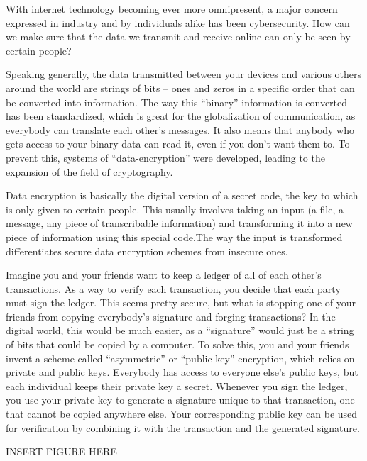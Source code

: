 With internet technology becoming ever more omnipresent, a major concern expressed in industry and by individuals alike has been cybersecurity. How can we make sure that the data we transmit and receive online can only be seen by certain people?

Speaking generally, the data transmitted between your devices and various others around the world are strings of bits – ones and zeros in a specific order that can be converted into information. The way this “binary” information is converted has been standardized, which is great for the globalization of communication, as everybody can translate each other’s messages. It also means that anybody who gets access to your binary data can read it, even if you don’t want them to. To prevent this, systems of “data-encryption” were developed, leading to the expansion of the field of cryptography.

Data encryption is basically the digital version of a secret code, the key to which is only given to certain people. This usually involves taking an input (a file, a message, any piece of transcribable information) and transforming it into a new piece of information using this special code.The way the input is transformed differentiates secure data encryption schemes from insecure ones.

Imagine you and your friends want to keep a ledger of all of each other’s transactions. As a way to verify each transaction, you decide that each party must sign the ledger. This seems pretty secure, but what is stopping one of your friends from copying everybody’s signature and forging transactions? In the digital world, this would be much easier, as a “signature” would just be a string of bits that could be copied by a computer. To solve this, you and your friends invent a scheme called “asymmetric” or “public key” encryption, which relies on  private and public keys. Everybody has access to everyone else’s public keys, but each individual keeps their private key a secret. Whenever you sign the ledger, you use your private key to generate a signature unique to that transaction, one that cannot be copied anywhere else. Your corresponding public key can be used for verification by combining it with the transaction and the generated signature. 

\begin{center}
    INSERT FIGURE HERE
\end{center}

